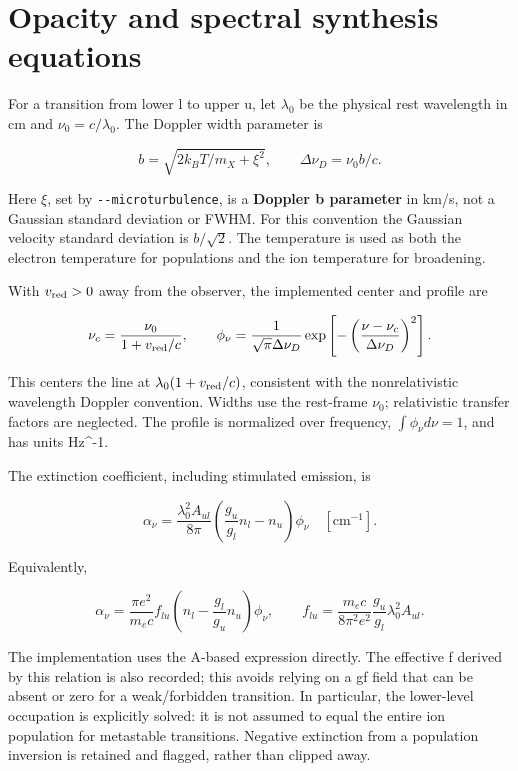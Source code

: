 \documentclass[
]{article}
\newcommand{\passthrough}[1]{#1}
\begin{document}
\section{Opacity and spectral synthesis
equations}\label{opacity-and-spectral-synthesis-equations}

For a transition from lower l to upper u, let \(\lambda_0\) be the
physical rest wavelength in cm and \(\nu_0=c/\lambda_0\). The Doppler
width parameter is

\[
b=\sqrt{2k_BT/m_X+\xi^2}, \qquad \Delta\nu_D=\nu_0 b/c.
\]

Here \(\xi\), set by \passthrough{\lstinline!--microturbulence!}, is a
\textbf{Doppler b parameter} in km/s, not a Gaussian standard deviation
or FWHM. For this convention the Gaussian velocity standard deviation is
\(b/\sqrt{2}\). The temperature is used as both the electron temperature
for populations and the ion temperature for broadening.

With \(v_{\rm red}>0\) away from the observer, the implemented center
and profile are

\[
\nu_c=\frac{\nu_0}{1+v_{\rm red}/c}, \qquad
\phi_\nu=\frac{1}{\sqrt{\pi}\Delta\nu_D}
\exp\left[-\left(\frac{\nu-\nu_c}{\Delta\nu_D}\right)^2\right].
\]

This centers the line at \(\lambda_0(1+v_{\rm red}/c)\), consistent with
the nonrelativistic wavelength Doppler convention. Widths use the
rest-frame \(\nu_0\); relativistic transfer factors are neglected. The
profile is normalized over frequency, \(\int\phi_\nu d\nu=1\), and has
units Hz\^{}-1.

The extinction coefficient, including stimulated emission, is

\[
\boxed{\alpha_\nu=\frac{\lambda_0^2 A_{ul}}{8\pi}
\left(\frac{g_u}{g_l}n_l-n_u\right)\phi_\nu}
\quad [\mathrm{cm}^{-1}].
\]

Equivalently,

\[
\alpha_\nu=\frac{\pi e^2}{m_e c}f_{lu}
\left(n_l-\frac{g_l}{g_u}n_u\right)\phi_\nu,\qquad
f_{lu}=\frac{m_e c}{8\pi^2 e^2}\frac{g_u}{g_l}\lambda_0^2 A_{ul}.
\]

The implementation uses the A-based expression directly. The effective f
derived by this relation is also recorded; this avoids relying on a gf
field that can be absent or zero for a weak/forbidden transition. In
particular, the lower-level occupation is explicitly solved: it is not
assumed to equal the entire ion population for metastable transitions.
Negative extinction from a population inversion is retained and flagged,
rather than clipped away.
\end{document}
